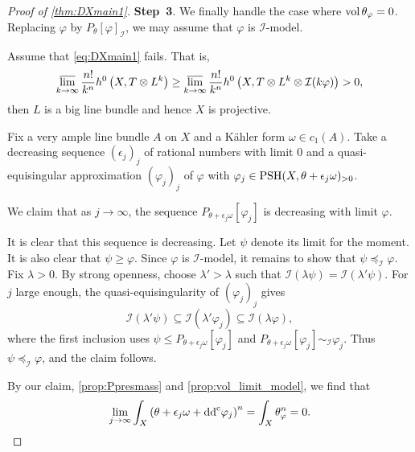 \begin{proof}[Proof of \cref{thm:DXmain1}]
    \textbf{Step~3}. We finally handle the case where $\operatorname{vol} \theta_{\varphi}=0$. Replacing $\varphi$ by $P_{\theta}[\varphi]_{\mathcal{I}}$, we may assume that $\varphi$ is $\mathcal{I}$-model.

    Assume that \eqref{eq:DXmain1} fails. That is,
    \[
    \varlimsup_{k\to\infty}\frac{n!}{k^n}h^0\left(X,T\otimes L^k\right)\geq \varlimsup_{k\to\infty} \frac{n!}{k^n}h^0\left(X,T\otimes L^k\otimes \mathcal{I}(k\varphi)\right)>0,
    \]
    then $L$ is a big line bundle and hence $X$ is projective.

    Fix a very ample line bundle $A$ on $X$ and a K\"ahler form $\omega\in c_1(A)$. Take a decreasing sequence $(\epsilon_j)_j$ of rational numbers with limit $0$ and a quasi-equisingular approximation $(\varphi_j)_j$ of $\varphi$ with $\varphi_j\in \mathrm{PSH}(X,\theta+\epsilon_j\omega)_{>0}$.

    We claim that as $j\to\infty$, the sequence $P_{\theta+\epsilon_j\omega}[\varphi_j]$ is decreasing with limit $\varphi$.

    It is clear that this sequence is decreasing. Let $\psi$ denote its limit for the moment. It is also clear that $\psi\geq\varphi$. Since $\varphi$ is $\mathcal{I}$-model, it remains to show that $\psi\preceq_{\mathcal{I}}\varphi$. Fix $\lambda>0$. By strong openness, choose $\lambda'>\lambda$ such that $\mathcal{I}(\lambda\psi)=\mathcal{I}(\lambda'\psi)$. For $j$ large enough, the quasi-equisingularity of $(\varphi_j)_j$ gives
    \[
        \mathcal{I}(\lambda'\psi)\subseteq \mathcal{I}(\lambda'\varphi_j)\subseteq \mathcal{I}(\lambda\varphi),
    \]
    where the first inclusion uses $\psi\leq P_{\theta+\epsilon_j\omega}[\varphi_j]$ and $P_{\theta+\epsilon_j\omega}[\varphi_j]\sim_{\mathcal{I}}\varphi_j$. Thus $\psi\preceq_{\mathcal{I}}\varphi$, and the claim follows.

    By our claim, \cref{prop:Ppresmass} and \cref{prop:vol_limit_model}, we find that
    \begin{equation}\label{eq:volumeconv0temp1}
    \lim_{j\to\infty} \int_X \left(\theta+\epsilon_j\omega+\mathrm{dd}^{\mathrm{c}} \varphi_j\right)^n=\int_X \theta_{\varphi}^n=0.
    \end{equation}


\end{proof}
